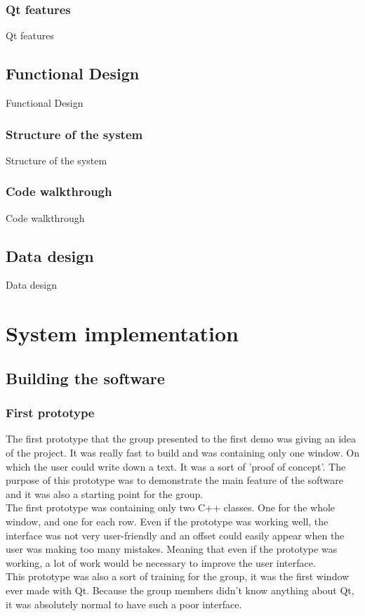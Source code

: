 \section{Qt features}
Qt features

\chapter{Functional Design}
Functional Design

\section{Structure of the system}
Structure of the system

\section{Code walkthrough}
Code walkthrough


\chapter{Data design}
Data design
\part{System implementation}

\chapter{Building the software}
\section{First prototype}
The first prototype that the group presented to the first demo was giving an idea of the project. It was really fast to build and was containing only one window. On which the user could write down a text. It was a sort of 'proof of concept'. The purpose of this prototype was to demonstrate the main feature of the software and it was also a starting point for the group.\\
The first prototype was containing only two C++ classes. One for the whole window, and one for each row. Even if the prototype was working well, the interface was not very user-friendly and an offset could easily appear when the user was making too many mistakes.
Meaning that even if the prototype was working, a lot of work would be necessary to improve the user interface. \\
This prototype was also a sort of training for the group, it was the first window ever made with Qt. Because the group members didn't know anything about Qt, it was absolutely normal to have such a poor interface.

